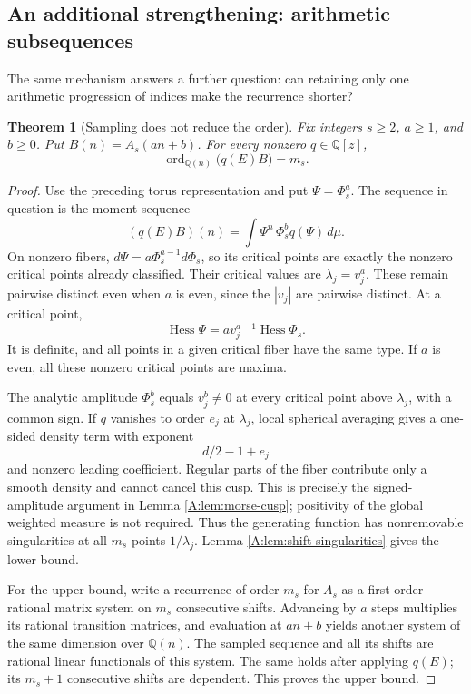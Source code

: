 \documentclass[11pt,a4paper]{article}
\newtheorem{theorem}{Theorem}[section]
\theoremstyle{definition}
\theoremstyle{remark}
\numberwithin{equation}{section}
\newcommand{\Q}{\mathbb Q}\newcommand{\Z}{\mathbb Z}
\begin{document}
\subsection{An additional strengthening: arithmetic subsequences}
The same mechanism answers a further question: can retaining only one
arithmetic progression of indices make the recurrence shorter?

\begin{theorem}[Sampling does not reduce the order]\label{A:thm:franel-sampling}
Fix integers $s\ge2$, $a\ge1$, and $b\ge0$. Put $B(n)=A_s(an+b)$.
For every nonzero $q\in\Q[z]$,
\[
 \boxed{\operatorname{ord}_{\Q(n)}\bigl(q(E)B\bigr)=m_s.}
\]
\end{theorem}
\begin{proof}
Use the preceding torus representation and put $\Psi=\Phi_s^a$.
The sequence in question is the moment sequence
\[
 (q(E)B)(n)=\int \Psi^n\,\Phi_s^b q(\Psi)\,d\mu.
\]
On nonzero fibers, $d\Psi=a\Phi_s^{a-1}d\Phi_s$, so its critical
points are exactly the nonzero critical points already classified.
Their critical values are $\lambda_j=v_j^a$. These remain pairwise
distinct even when $a$ is even, since the $|v_j|$ are pairwise distinct.
At a critical point,
\[
 \operatorname{Hess}\Psi=a v_j^{a-1}\operatorname{Hess}\Phi_s.
\]
It is definite, and all points in a given critical fiber have the same
type. If $a$ is even, all these nonzero critical points are maxima.

The analytic amplitude $\Phi_s^b$ equals $v_j^b\ne0$ at every critical
point above $\lambda_j$, with a common sign. If $q$ vanishes to order
$e_j$ at $\lambda_j$, local spherical averaging gives a one-sided
density term with exponent
\[
 d/2-1+e_j
\]
and nonzero leading coefficient. Regular parts of the fiber contribute
only a smooth density and cannot cancel this cusp. This is precisely
the signed-amplitude argument in Lemma \ref{A:lem:morse-cusp}; positivity
of the global weighted measure is not required. Thus the generating
function has nonremovable singularities at all $m_s$ points
$1/\lambda_j$. Lemma \ref{A:lem:shift-singularities} gives the lower bound.

For the upper bound, write a recurrence of order $m_s$ for $A_s$ as a
first-order rational matrix system on $m_s$ consecutive shifts. Advancing
by $a$ steps multiplies its rational transition matrices, and evaluation
at $an+b$ yields another system of the same dimension over $\Q(n)$.
The sampled sequence and all its shifts are rational linear functionals
of this system. The same holds after applying $q(E)$; its $m_s+1$
consecutive shifts are dependent. This proves the upper bound.
\end{proof}
\end{document}
